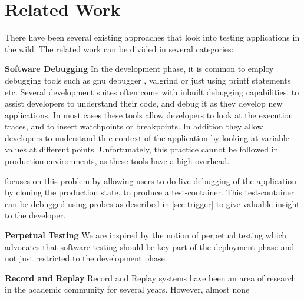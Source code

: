 \section{Related Work}
\label{sec:related}

There have been several existing approaches that look into testing applications in the wild. 
The related work can be divided in several categories:

  
\textbf{Software Debugging}  
  In the development phase, it is common to employ debugging tools such as gnu debugger \cite{gdb}, valgrind \cite{valgrind} or just using printf statements etc.
  Several development suites\cite{eclipse, visual_studio, intel_suite} often come with inbuilt debugging capabilities, to assist developers to understand their code, and debug it as they develop new applications.
  In most cases these tools allow developers to look at the execution traces, and to insert watchpoints or breakpoints.
  In addition they allow developers to understand th      e context of the application by looking at variable values at different points.
  Unfortunately, this practice cannot be followed in production environments, as these tools have a high overhead.
  
  \parikshan focuses on this problem by allowing users to do live debugging of the application by cloning the production state, to produce a test-container.
  This test-container can be debugged using probes as described in \ref{sec:trigger} to give valuable insight to the developer.
  
    
\textbf{Perpetual Testing}
     We are inspired by the notion of perpetual testing\cite{perpetual} which advocates that software testing should be key part of the deployment phase and not just restricted to the development phase.
  
\textbf{Record and Replay}  
  Record and Replay systems have been an area of research in the academic community for several years.
  However, almost none  
  
  \cite{altekar2009odr,dunlap2002revirt,guo2008r2, geels2007friday, laadan2010transparent}
  
  

